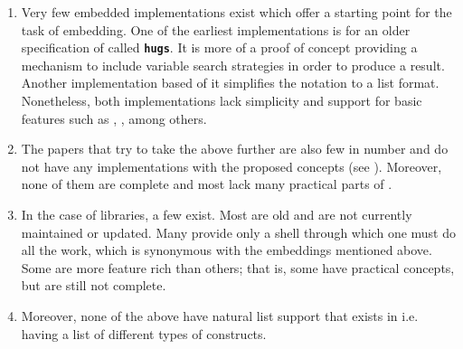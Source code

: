 \documentclass[thesis-solanki.tex]{subfiles}
\begin{document}
\begin{enumerate}
\item
  Very few embedded implementations exist which offer a starting point for the task of embedding.
  One of the earliest implementations \cite{website:mini-prolog-hugs98} is for an older specification of
   called  \texttt{\bfseries{hugs}}.
  It is more of a proof of concept providing a mechanism to include variable search strategies in order to produce
  a result.
  Another implementation \cite{website:takashi-workplace} based of it simplifies the notation to a list format.
  Nonetheless, both implementations lack simplicity and support for basic  features such as
  ,
  ,
  among others.

\begin{comment}
\item
  Only two embeddings exist, one of them is old and made for \texttt{\bfseries{hugs}} a functional programming
  system based on the \progLang{Haskell 98} specification.
  It is complex and also lacks a lot of \progLang{Prolog} like\eref{language-like} features including \textit{cuts, fails, assert}
  among others.
  The second one is based off the first one to make it simple but it loses the variable search strategy support
  which allows the programmer to choose the manner in which a solution is produced.
\end{comment}

\item
  The papers that try to take the above further are also few in number and do not have any implementations with the
  proposed concepts (see \cite{spivey1999embedding, seres1999algebra, seres2001algebra, spivey2000functional,
    seres2000optimisation}).
  Moreover, none of them are complete and most lack many practical parts of .

\item
  In the case of libraries, a few exist.
  Most are old and are not currently maintained or updated.
  Many provide only a shell through which one must do all the work, which is synonymous with
  the embeddings mentioned above.
  Some are more feature rich than others; that is, some have practical  concepts,
  but are still not complete.

\item
  Moreover, none of the above have natural list support that exists
  in  i.e. having a list of different types of  constructs.
\end{enumerate}
\end{document}
